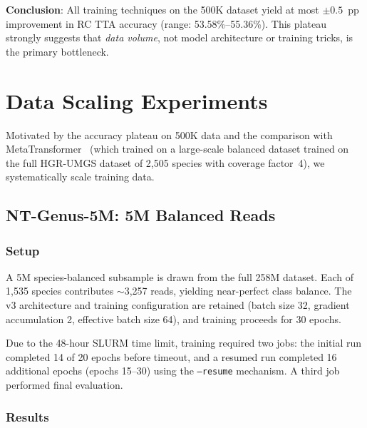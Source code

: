 \textbf{Conclusion}: All training techniques on the 500K dataset yield at most $\pm0.5$~pp improvement in RC TTA accuracy (range: 53.58\%--55.36\%). This plateau strongly suggests that \emph{data volume}, not model architecture or training tricks, is the primary bottleneck.

\section{Data Scaling Experiments}
\label{sec:exp-scaling}

Motivated by the accuracy plateau on 500K data and the comparison with MetaTransformer~\cite{Wichmann2023} (which trained on a large-scale balanced dataset trained on the full HGR-UMGS dataset of 2,505 species with coverage factor~4), we systematically scale training data.

\subsection{NT-Genus-5M: 5M Balanced Reads}

\subsubsection{Setup}

A 5M species-balanced subsample is drawn from the full 258M dataset. Each of 1,535 species contributes $\sim$3,257 reads, yielding near-perfect class balance. The v3 architecture and training configuration are retained (batch size 32, gradient accumulation 2, effective batch size 64), and training proceeds for 30 epochs.

Due to the 48-hour SLURM time limit, training required two jobs: the initial run completed 14 of 20 epochs before timeout, and a resumed run completed 16 additional epochs (epochs 15--30) using the \texttt{--resume} mechanism. A third job performed final evaluation.

\subsubsection{Results}

